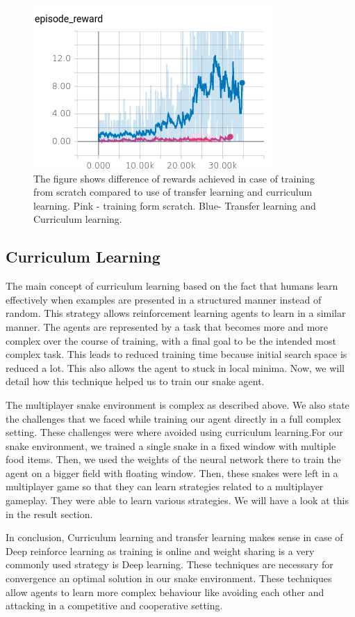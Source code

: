 \documentclass[conference,10pt]{IEEEtran}
\begin{document}
	\begin{figure}
	  \centering
	  \includegraphics[scale=3]{tflearbing.png}
	  \caption{The figure shows difference of rewards achieved in case of training from scratch compared to use of transfer learning and curriculum learning. Pink - training form scratch. Blue- Transfer learning and Curriculum learning. }
	\end{figure}

	\subsection{Curriculum Learning}
	The main concept of curriculum learning based on the fact that humans learn effectively when examples are presented in a structured manner instead of random. This strategy allows reinforcement learning agents to learn in a similar manner. The agents are represented by a task that becomes more and more complex over the course of training, with a final goal to be the intended most complex task. This leads to reduced training time because initial search space is reduced a lot. This also allows the agent to stuck in local minima. Now, we will detail how this technique helped us to train our snake agent.

	The multiplayer snake environment is complex as described above. We also state the challenges that we faced while training our agent directly in a full complex setting. These challenges were where avoided using curriculum learning.For our snake environment, we trained a single snake in a fixed window with multiple food items. Then, we used the weights of the neural network there to train the agent on a bigger field with floating window. Then, these snakes were left in a multiplayer game so that they can learn strategies related to a multiplayer gameplay. They were able to learn various strategies. We will have a look at this in the result section.


	In conclusion, Curriculum learning and transfer learning makes sense in case of Deep reinforce learning as training is online and weight sharing is a very commonly used strategy is Deep learning. These techniques are necessary for convergence an optimal solution in our snake environment. These techniques allow agents to learn more complex behaviour like avoiding each other and attacking in a competitive and cooperative setting.
	
\end{document}
